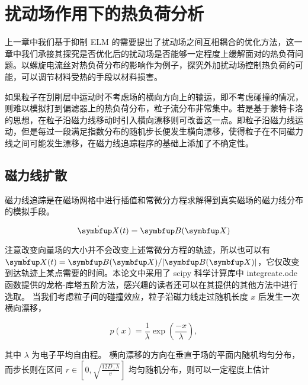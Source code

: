 \chapter{扰动场作用下的热负荷分析}



上一章中我们基于抑制 ELM 的需要提出了扰动场之间互相耦合的优化方法，这一章中我们承接其探究是否优化后的扰动场是否能够一定程度上缓解\Hmode 面对的热负荷问题。以螺旋电流丝对热负荷分布的影响作为例子，探究外加扰动场控制热负荷的可能，可以调节材料受热的手段以材料损害。


如果粒子在刮削层中运动时不考虑场的横向方向上的输运，即不考虑碰撞的情况，则难以模拟打到偏滤器上的热负荷分布，粒子流分布非常集中。若是基于蒙特卡洛的思想，在粒子沿磁力线移动时引入横向漂移则可改善这一点。即粒子沿磁力线运动，但是每过一段满足指数分布的随机步长便发生横向漂移，使得粒子在不同磁力线之间可能发生漂移，在磁力线追踪程序的基础上添加了不确定性。

\section{磁力线扩散}

  
磁力线追踪是在磁场网格中进行插值和常微分方程求解得到真实磁场的磁力线分布的模拟手段。


$$\dot{\vect{X}}(t) = \vect{B}(\vect{X}) $$

注意改变向量场的大小并不会改变上述常微分方程的轨迹，所以也可以有 $\dot{\vect{X}}(t) = \vect{B}(\vect{X})/|\vect{B}(\vect{X})| $，它仅改变到达轨迹上某点需要的时间。本论文中采用了 scipy 科学计算库中 integreate.ode 函数提供的龙格-库塔五阶方法，感兴趣的读者还可以在其提供的其他方法中进行选取。
当我们考虑粒子间的碰撞效应，粒子沿磁力线走过随机长度 $x$ 后发生一次横向漂移，

\begin{equation}
    p(x)=\frac{1}{\lambda} \exp \left(\frac{-x}{\lambda}\right),
\end{equation}

其中 $\lambda$ 为电子平均自由程。
横向漂移的方向在垂直于场的平面内随机均匀分布，而步长则在区间 $r \in[0, \sqrt{\frac{12 D_{\perp} \lambda}{v}}]$ 均匀随机分布，则可以一定程度上估计






